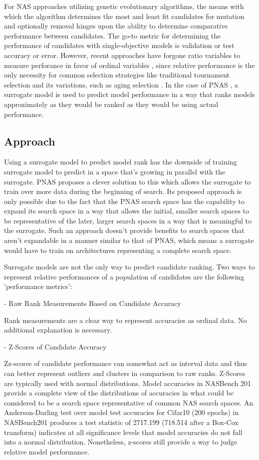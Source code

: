 \documentclass[twocolumn]{article}
\begin{document}
For NAS approaches utilizing genetic evolutionary algorithms, the means with which the algorithm determines the most and least fit candidates 
for mutation and optionally removal hinges upon the ability to determine comparative performance between candidates. The go-to metric for 
determining the performance of candidates with single-objective models is validation or test accuracy or error. However, recent approaches 
have forgone ratio variables to measure perforance in favor of ordinal variables \cite{pnas}, since relative performance is the only necessity 
for common selection strategies like traditional tournament selection and its variations, such as aging selection \cite{amoebanet}. 
In the case of PNAS \cite{pnas}, a surrogate model is used to predict model performance in a way that ranks models approximately as they would
be ranked as they would be using actual performance.


\subsection{Approach}

Using a surrogate model to predict model rank has the downside of training surrogate model to predict in a space that's growing in parallel with the
surrogate. PNAS \cite{pnas} proposes a clever solution to this which allows the surrogate to train over more data during the beginning of search.
Its proposed approach is only possible due to the fact that the PNAS search space has the capability to expand its search space in a way that
allows the initial, smaller search spaces to be representative of the later, larger search spaces in a way that is meaningful to the surrogate.
Such an approach doesn't provide benefits to search spaces that aren't expandable in a manner similar to that of PNAS, which means a surrogate would
have to train on architectures representing a complete search space. 


Surrogate models are not the only way to predict candidate ranking. Two ways to represent relative performances of a population of candidates are the following 'performance metrics':

- Raw Rank Measurements Based on Candidate Accuracy

Rank measurements are a clear way to represent accuracies as ordinal data. No additional explanation is necessary.

- Z-Scores of Candidate Accuracy

Zz-scores of candidate performance can somewhat act as interval data and thus can better represent outliers and clusters in comparison to raw ranks. 
Z-Scores are typically used with normal distributions.
Model accuracies in NASBench 201 \cite{nasbench201} provide a complete view of the distributions of accuracies in what could be considered to be 
a search space representative of common NAS search spaces. 
An Anderson-Darling test over model test accuracies for Cifar10 (200 epochs) in NASBench201 produces a test statistic of 2717.199 
(718.514 after a Box-Cox transform) indicates at all significance levels that model accuracies do not fall into a normal distribution. 
Nonetheless, z-scores still provide a way to judge relative model performance.
\end{document}
